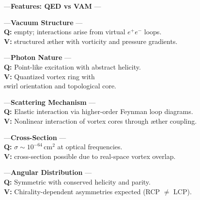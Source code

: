                 —\textbf{Features: QED vs VAM} —\\
                \begin{footnotesize}
                    \noindent\begin{minipage}{\linewidth}

                         \hspace*{2em}—\textbf{Vacuum Structure} —\\
                         \textbf{Q:} empty; interactions arise from  virtual $e^+e^-$ loops.\\
                         \textbf{V:} structured æther with vorticity and pressure gradients.

                         \vspace{3pt}
                         \hspace*{2em}—\textbf{Photon Nature} —\\
                         \textbf{Q:} Point-like excitation with abstract helicity.\\
                         \textbf{V:} Quantized vortex ring with \\swirl orientation and topological core.

                         \vspace{3pt}
                         \hspace*{2em}—\textbf{Scattering Mechanism} —\\
                         \textbf{Q:} Elastic interaction via higher-order Feynman loop diagrams.\\
                         \textbf{V:} Nonlinear interaction of vortex cores through æther coupling.

                         \vspace{3pt}
                         \hspace*{2em}—\textbf{Cross-Section} —\\
                         \textbf{Q:} $\sigma \sim 10^{-64}\,\mathrm{cm}^2$ at optical frequencies.\\
                         \textbf{V:} cross-section possible due to real-space vortex overlap.

                         \vspace{3pt}
                         \hspace*{2em}—\textbf{Angular Distribution} —\\
                         \textbf{Q:} Symmetric with conserved helicity and parity.\\
                         \textbf{V:} Chirality-dependent asymmetries expected (RCP $\ne$ LCP).


\end{minipage}
\end{footnotesize}
